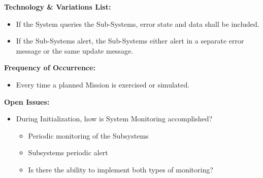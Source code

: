 \documentclass[letterpaper]{article}
\begin{document}
\textbf{Technology \& Variations List:}
\begin{itemize}
   \item If the System queries the Sub-Systems, error state and data 
      shall be included.
   \item If the Sub-Systems alert, the Sub-Systems either alert in a
      separate error message or the same update message.
\end{itemize}
\textbf{Frequency of Occurrence:}
\begin{itemize}
   \item Every time a planned Mission is exercised or simulated.
\end{itemize}
\textbf{Open Issues:}
\begin{itemize}
   \item During Initialization, how is System Monitoring accomplished?
      \begin{itemize}
         \item Periodic monitoring of the Subsystems
         \item Subsystems periodic alert
         \item Is there the ability to implement both types of
            monitoring?
      \end{itemize}
\end{itemize}
\end{document}
